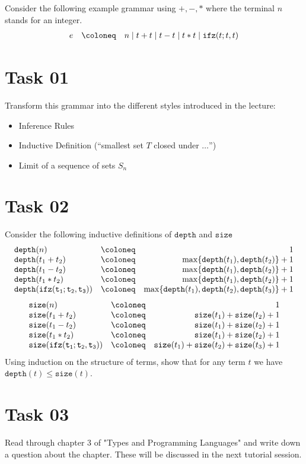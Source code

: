 Consider the following example grammar using $+,-,*$ where the terminal $n$ stands for an integer.
\[
  \begin{array}{l c r}
  e & \coloneq & n \mid t + t \mid t - t \mid t * t \mid  \mathtt{ifz}(t;t,t) 
  \end{array}
\]

\section*{Task 01}
Transform this grammar into the different styles introduced in the lecture:
\begin{itemize}
\item Inference Rules
\item Inductive Definition (``smallest set $T$ closed under $\dots$'')
\item Limit of a sequence of sets $S_n$
\end{itemize}

\section*{Task 02}
Consider the following inductive definitions of $\mathtt{depth}$ and $\mathtt{size}$
\[
\begin{array}{l c r}
\mathtt{depth}(n) & \coloneq&  1\\
\mathtt{depth}(t_1+t_2) &\coloneq&\max\{\mathtt{depth}(t_1),\mathtt{depth}(t_2)\} + 1\\
\mathtt{depth}(t_1-t_2) &\coloneq& \max\{\mathtt{depth}(t_1),\mathtt{depth}(t_2)\} + 1\\
\mathtt{depth}(t_1*t_2) &\coloneq& \max\{\mathtt{depth}(t_1),\mathtt{depth}(t_2)\} + 1\\
\mathtt{depth}(\mathtt{ifz(t_1;t_2,t_3)}) &\coloneq& \max\{\mathtt{depth}(t_1),\mathtt{depth}(t_2),\mathtt{depth}(t_3)\} + 1
\end{array}
\]
\[
\begin{array}{l c r}
\mathtt{size}(n) & \coloneq&  1\\
\mathtt{size}(t_1+t_2) &\coloneq& \mathtt{size}(t_1)+\mathtt{size}(t_2) + 1\\
\mathtt{size}(t_1-t_2) &\coloneq& \mathtt{size}(t_1)+\mathtt{size}(t_2) + 1\\
\mathtt{size}(t_1*t_2) &\coloneq& \mathtt{size}(t_1)+\mathtt{size}(t_2) + 1\\
\mathtt{size}(\mathtt{ifz(t_1;t_2,t_3)}) &\coloneq& \mathtt{size}(t_1)+\mathtt{size}(t_2)+\mathtt{size}(t_3) + 1
\end{array}
\]
Using induction on the structure of terms, show that for any term $t$ we have $\mathtt{depth}(t) \leq \mathtt{size}(t)$.

\section*{Task 03}
Read through chapter 3 of "Types and Programming Languages" and write down a question about the chapter. 
These will be discussed in the next tutorial session.
